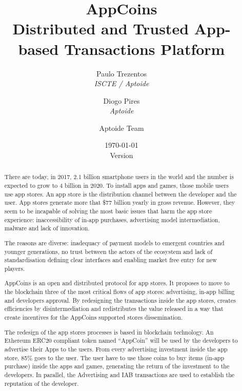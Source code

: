 \documentclass[12pt, a4paper, titlepage]{article}
\title{AppCoins\\ Distributed and Trusted App-based Transactions Platform}
\author{\small Paulo Trezentos  \\
  {\em  ISCTE / Aptoide}  \\
  \and 
\small  Diogo Pires \\
  {\em Aptoide} \\
  \and
  Aptoide Team
  }
\date{\today\\\normalsize Version \versionnumber}
\begin{document}
\maketitle


\begin{abstract}

There are today, in 2017, 2.1 billion smartphone users in the world and the number is expected to grow to  4 billion in 2020. To install apps and games, those mobile users use app stores. An app store is the distribution channel between the developer and the user. App stores generate more that \$77 billion yearly in gross revenue.  However, they seem to be incapable of solving the most basic issues that harm the app store experience: inaccessibility of in-app purchases, advertising model intermediation, malware and lack of innovation.

The reasons are diverse: inadequacy of payment models to emergent countries and younger generations, no trust between the actors of the ecosystem and lack of standardisation defining clear interfaces and enabling market free entry for new players.

AppCoins is an open and distributed protocol for app stores. It proposes to move to the blockchain three of the most critical flows of app stores: advertising, in-app billing and developers approval. By redesigning the transactions inside the app stores, creates efficiencies by disintermediation and redistributes the value released in a way that create incentives for the AppCoins supported stores dissemination.

The redesign of the app stores processes is based in blockchain technology. An Ethereum ERC20 compliant token named ``AppCoin'' will be used by the developers to advertise their Apps to the users. From every advertising investment inside the app store, 85\% goes to the user. The user have to use those coins to buy items (in-app purchase) inside the apps and games, generating the return of the investment to the developers. In parallel, the Advertising and IAB transactions are used to establish the reputation of the developer.


\end{abstract}
\end{document}
